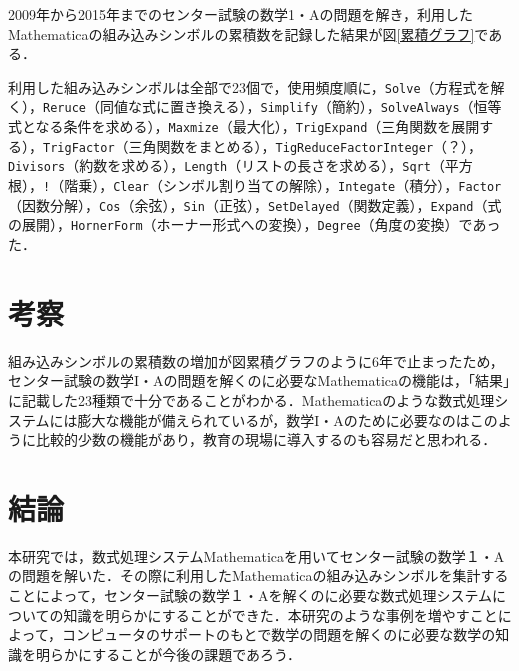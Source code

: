 \documentclass[uplatex,twocolumn]{jsarticle}
\begin{document}
2009年から2015年までのセンター試験の数学1・Aの問題を解き，利用したMathematicaの組み込みシンボルの累積数を記録した結果が図\ref{累積グラフ}である．

利用した組み込みシンボルは全部で23個で，使用頻度順に，\verb|Solve|（方程式を解く），\verb|Reruce|（同値な式に置き換える），\verb|Simplify|（簡約），\verb|SolveAlways|（恒等式となる条件を求める），\verb|Maxmize|（最大化），\verb|TrigExpand|（三角関数を展開する），\verb|TrigFactor|（三角関数をまとめる），\verb|TigReduceFactorInteger|（？），\verb|Divisors|（約数を求める），\verb|Length|（リストの長さを求める），\verb|Sqrt|（平方根），\verb|!|（階乗），\verb|Clear|（シンボル割り当ての解除），\verb|Integate|（積分），\verb|Factor|（因数分解），\verb|Cos|（余弦），\verb|Sin|（正弦），\verb|SetDelayed|（関数定義），\verb|Expand|（式の展開），\verb|HornerForm|（ホーナー形式への変換），\verb|Degree|（角度の変換）であった．

\section{考察}

組み込みシンボルの累積数の増加が図{累積グラフ}のように6年で止まったため，センター試験の数学I・Aの問題を解くのに必要なMathematicaの機能は，「結果」に記載した23種類で十分であることがわかる．Mathematicaのような数式処理システムには膨大な機能が備えられているが，数学I・Aのために必要なのはこのように比較的少数の機能があり，教育の現場に導入するのも容易だと思われる．

\section{結論}

本研究では，数式処理システムMathematicaを用いてセンター試験の数学１・Aの問題を解いた．その際に利用したMathematicaの組み込みシンボルを集計することによって，センター試験の数学１・Aを解くのに必要な数式処理システムについての知識を明らかにすることができた．本研究のような事例を増やすことによって，コンピュータのサポートのもとで数学の問題を解くのに必要な数学の知識を明らかにすることが今後の課題であろう．


\small
\end{document}

